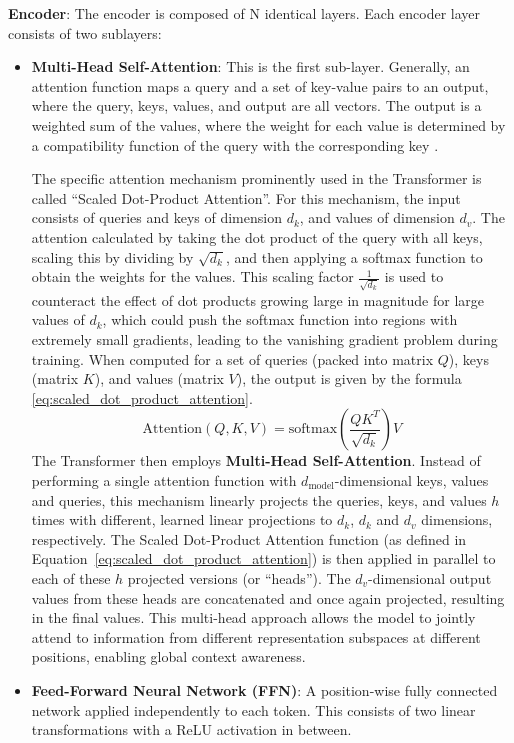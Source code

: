 \textbf{Encoder}:
The encoder is composed of N identical layers. Each encoder layer consists of two sublayers:  

\begin{itemize}
    \item \textbf{Multi-Head Self-Attention}: This is the first sub-layer. Generally, an attention function maps a query and a set of key-value pairs to an output, where the query, keys, values, and output are all vectors. The output is a weighted sum of the values, where the weight for each value is determined by a compatibility function of the query with the corresponding key \cite{vaswani2017attention}.

    The specific attention mechanism prominently used in the Transformer is called ``Scaled Dot-Product Attention''. 
    For this mechanism, the input consists of queries and keys of dimension $d_k$, and values of dimension $d_v$. 
    The attention calculated by taking the dot product of the query with all keys, scaling this by dividing by $\sqrt{d_k}$, and then applying a softmax function to obtain the weights for the values. 
    This scaling factor $\frac{1}{\sqrt{d_k}}$ is used to counteract the effect of dot products growing large in magnitude for large values of $d_k$, which could push the softmax function into regions with extremely small gradients, leading to the vanishing gradient problem during training. 
    When computed for a set of queries (packed into matrix $Q$), keys (matrix $K$), and values (matrix $V$), the output is given by the formula \ref{eq:scaled_dot_product_attention}.
    \begin{equation}
    \text{Attention}(Q, K, V) = \text{softmax}\left(\frac{QK^T}{\sqrt{d_k}}\right)V
    \label{eq:scaled_dot_product_attention} 
    \end{equation}
    The Transformer then employs \textbf{Multi-Head Self-Attention}. Instead of performing a single attention function with $d_{\text{model}}$-dimensional keys, values and queries, this mechanism linearly projects the queries, keys, and values $h$ times with different, learned linear projections to $d_k$, $d_k$ and $d_v$ dimensions, respectively. 
    The Scaled Dot-Product Attention function (as defined in Equation~\ref{eq:scaled_dot_product_attention}) is then applied in parallel to each of these $h$ projected versions (or ``heads''). The $d_v$-dimensional output values from these heads are concatenated and once again projected, resulting in the final values. 
    This multi-head approach allows the model to jointly attend to information from different representation subspaces at different positions, enabling global context awareness.

    \item \textbf{Feed-Forward Neural Network (FFN)}: A position-wise fully connected network applied independently to each token. This consists of two linear transformations with a ReLU activation in between.
\end{itemize}

